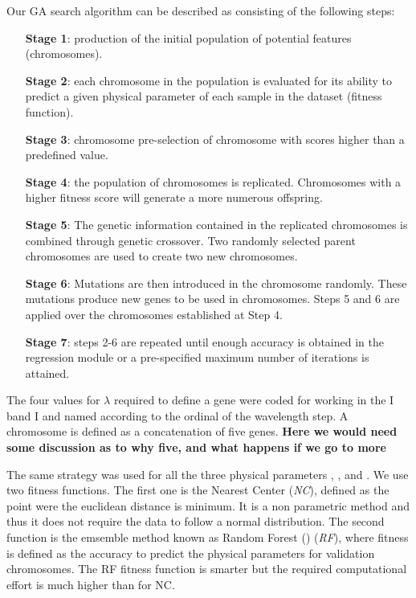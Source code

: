 Our GA search algorithm can be described as consisting of the
following steps:
\begin{itemize}
 \item [\textbf{Stage 1}:]{production of the initial population of
   potential features (chromosomes).}
 \item [\textbf{Stage 2}:]{each chromosome in the population is
   evaluated for its ability to predict a given physical parameter of
   each sample in the dataset (fitness function).}
 \item [\textbf{Stage 3}:]{chromosome pre-selection of chromosome with
   scores higher than a predefined value.}
 \item [\textbf{Stage 4}:]{the population of chromosomes is
   replicated.  Chromosomes with a higher fitness score will generate
   a more numerous offspring.}
 \item [\textbf{Stage 5}:]{The genetic information contained in the
   replicated chromosomes is combined through genetic
   crossover. Two randomly selected parent chromosomes are used to
   create two new chromosomes.}
 \item [\textbf{Stage 6}:]{Mutations are then introduced in the
   chromosome randomly.  These mutations produce new genes to be used
   in chromosomes.  Steps 5 and 6 are applied over the chromosomes
   established at Step 4.}
  \item [\textbf{Stage 7}:]{steps 2-6 are repeated until enough
    accuracy is obtained in the regression module or a pre-specified
    maximum number of iterations is attained.}
\end{itemize}

The four values for $\lambda$ required to define a gene were coded for
working in the I band I and named according to the ordinal of the
wavelength step.  A chromosome is defined as a concatenation of five
genes. {\bf Here we would need some discussion as to why five, and
  what happens if we go to more}


The same strategy was used for all the three physical parameters
\teff, \logg, and \metal.  We use two fitness functions. The first one
is the Nearest Center (\emph{NC}), defined as the point were the
euclidean distance is minimum. It is a non parametric method and thus
it does not require the data to follow a normal distribution.  The
second function is the emsemble method known as Random Forest
(\cite{breiman2001random}) (\emph{RF}), where fitness is defined as
the accuracy to predict the physical parameters for validation
chromosomes. The RF fitness function is smarter but the required
computational effort is much higher than for NC.


